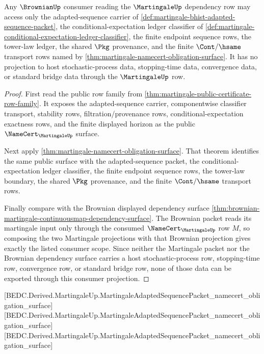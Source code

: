 \begin{theorem}
\label{thm:martingale-brownian-consumer-projection-scope}
Any $\BrownianUp$ consumer reading the $\MartingaleUp$ dependency row may access
only the adapted-sequence carrier of
\autoref{def:martingale-bhist-adapted-sequence-packet}, the
conditional-expectation ledger classifier of
\autoref{def:martingale-conditional-expectation-ledger-classifier}, the finite
endpoint sequence rows, the tower-law ledger, the shared $\Pkg$ provenance, and
the finite $\Cont/\hsame$ transport rows named by
\autoref{thm:martingale-namecert-obligation-surface}. It has no projection to
host stochastic-process data, stopping-time data, convergence data, or standard
bridge data through the $\MartingaleUp$ row.
\end{theorem}
\begin{proof}
First read the public row family from
\autoref{thm:martingale-public-certificate-row-family}. It exposes the
adapted-sequence carrier, componentwise classifier transport, stability rows,
filtration/provenance rows, conditional-expectation exactness rows, and the
finite displayed horizon as the public $\NameCert_{\MartingaleUp}$ surface.

Next apply \autoref{thm:martingale-namecert-obligation-surface}. That theorem
identifies the same public surface with the adapted-sequence packet, the
conditional-expectation ledger classifier, the finite endpoint sequence rows,
the tower-law boundary, the shared $\Pkg$ provenance, and the finite
$\Cont/\hsame$ transport rows.

Finally compare with the Brownian displayed dependency surface
\autoref{thm:brownian-martingale-continuousmap-dependency-surface}. The
Brownian packet reads its martingale input only through the consumed
$\NameCert_{\MartingaleUp}$ row $M$, so composing the two Martingale projections
with that Brownian projection gives exactly the listed consumer scope. Since
neither the Martingale packet nor the Brownian dependency surface carries a host
stochastic-process row, stopping-time row, convergence row, or standard bridge
row, none of those data can be exported through this consumer projection.
\end{proof}

[BEDC.Derived.MartingaleUp.MartingaleAdaptedSequencePacket\_namecert\_obligation\_surface]
[BEDC.Derived.MartingaleUp.MartingaleAdaptedSequencePacket\_namecert\_obligation\_surface]
[BEDC.Derived.MartingaleUp.MartingaleAdaptedSequencePacket\_namecert\_obligation\_surface]

